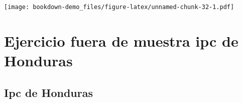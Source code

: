 \documentclass[
]{book}
\newenvironment{Shaded}{\begin{snugshade}}{\end{snugshade}}
\newcommand{\AttributeTok}[1]{\textcolor[rgb]{0.77,0.63,0.00}{#1}}
\newcommand{\DecValTok}[1]{\textcolor[rgb]{0.00,0.00,0.81}{#1}}
\newcommand{\FunctionTok}[1]{\textcolor[rgb]{0.00,0.00,0.00}{#1}}
\newcommand{\NormalTok}[1]{#1}
\newcommand{\OtherTok}[1]{\textcolor[rgb]{0.56,0.35,0.01}{#1}}
\newcommand{\SpecialCharTok}[1]{\textcolor[rgb]{0.00,0.00,0.00}{#1}}
\newcommand{\StringTok}[1]{\textcolor[rgb]{0.31,0.60,0.02}{#1}}
\begin{document}
\begin{Shaded}
\end{Shaded}

\texttt{[image: bookdown-demo\_files/figure-latex/unnamed-chunk-32-1.pdf]}

\hypertarget{ejercicio-fuera-de-muestra-ipc-de-honduras}{%
\chapter{Ejercicio fuera de muestra ipc de Honduras}\label{ejercicio-fuera-de-muestra-ipc-de-honduras}}

\hypertarget{ipc-de-honduras}{%
\section{Ipc de Honduras}\label{ipc-de-honduras}}
\end{document}
